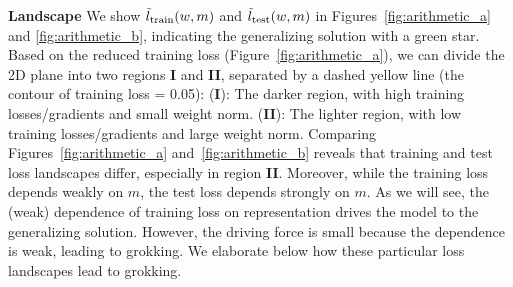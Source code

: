 \documentclass{article} %
\begin{document}
{\bf Landscape} We show $\tilde{l}_{\rm train}(w, m)$ and $\tilde{l}_{\rm test}(w, m)$ in Figures~\ref{fig:arithmetic_a} and \ref{fig:arithmetic_b}, indicating the generalizing solution with a green star.
Based on the reduced training loss (Figure~\ref{fig:arithmetic_a}), we can divide the 2D plane into two regions {\bf I} and {\bf II}, separated by a dashed yellow line (the contour of training loss = 0.05): ({\bf I}): The darker region, with high training losses/gradients and small weight norm. ({\bf II}): The lighter region, with low training losses/gradients and large weight norm. Comparing Figures~\ref{fig:arithmetic_a} and~\ref{fig:arithmetic_b} reveals that training and test loss landscapes differ, especially in region {\bf II}. Moreover, while the training loss depends weakly on $m$, the test loss depends strongly on $m$. As we will see, the (weak) dependence of training loss on representation drives the model to the generalizing solution. However, the driving force is small because the dependence is weak, leading to grokking. %
We elaborate below how these particular loss landscapes lead to grokking. %
\end{document}
